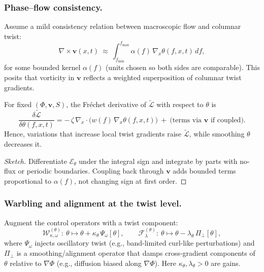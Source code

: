 \documentclass[a4paper,11pt]{article}
\begin{document}
\subsubsection{Phase–flow consistency.}
Assume a mild consistency relation between macroscopic flow and columnar twist:
\begin{equation}
\nabla\times \mathbf{v}(x,t)\ \approx\ \int_{f_{\min}}^{f_{\max}} \alpha(f)\,\nabla_x \theta(f,x,t)\,df,
\end{equation}
for some bounded kernel $\alpha(f)$ (units chosen so both sides are comparable).
This posits that vorticity in $\mathbf{v}$ reflects a weighted superposition of
columnar twist gradients.

\begin{lemma}
\label{lem:first-var-theta}
For fixed $(\Phi,\mathbf{v},S)$, the Fréchet derivative of $\widetilde{\mathcal{L}}$
with respect to $\theta$ is
\begin{equation}
\frac{\delta \widetilde{\mathcal{L}}}{\delta \theta(f,x,t)}
= -\,\zeta\,\nabla_x\!\cdot\!\big(w(f)\,\nabla_x \theta(f,x,t)\big)\ +\ \text{(terms via $\mathbf{v}$ if coupled)}.
\end{equation}
Hence, variations that increase local twist gradients raise $\widetilde{\mathcal{L}}$,
while smoothing $\theta$ decreases it.
\end{lemma}

\begin{proof}[Sketch]
Differentiate $\mathcal{E}_\theta$ under the integral sign and integrate by parts
with no-flux or periodic boundaries. Coupling back through $\mathbf{v}$ adds
bounded terms proportional to $\alpha(f)$, not changing sign at first order.
\end{proof}

\subsubsection{Warbling and alignment at the twist level.}
Augment the control operators with a twist component:
\begin{equation}
\mathcal{W}^{(\theta)}_{\kappa,\omega}:\ \theta \mapsto \theta + \kappa_\theta\,\Psi_\omega[\theta],\qquad
\mathcal{F}^{(\theta)}_{\lambda}:\ \theta \mapsto \theta - \lambda_\theta\,\Pi_\perp[\theta],
\end{equation}
where $\Psi_\omega$ injects oscillatory twist (e.g., band-limited curl-like
perturbations) and $\Pi_\perp$ is a smoothing/alignment operator that damps
cross-gradient components of $\theta$ relative to $\nabla\Phi$ (e.g., diffusion
biased along $\nabla\Phi$). Here $\kappa_\theta,\lambda_\theta>0$ are gains.
\end{document}
